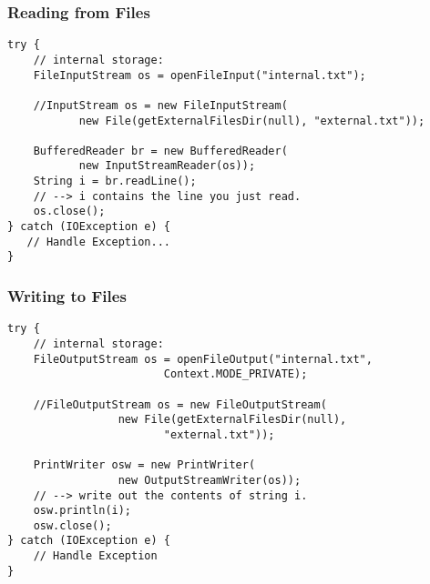 \begin{frame}[fragile]
\frametitle{Reading from Files}
\begin{changemargin}{1cm}

{\scriptsize
\begin{verbatim}
try {
    // internal storage: 
    FileInputStream os = openFileInput("internal.txt");
    
    //InputStream os = new FileInputStream(
           new File(getExternalFilesDir(null), "external.txt"));
           
    BufferedReader br = new BufferedReader(
           new InputStreamReader(os));
    String i = br.readLine();
    // --> i contains the line you just read.
    os.close();
} catch (IOException e) {
   // Handle Exception...
}
\end{verbatim}
}

\end{changemargin}
\end{frame}


\begin{frame}[fragile]
\frametitle{Writing to Files}
\begin{changemargin}{1cm}

{\scriptsize
\begin{verbatim}
try {
    // internal storage:
    FileOutputStream os = openFileOutput("internal.txt", 
                        Context.MODE_PRIVATE);
                        
    //FileOutputStream os = new FileOutputStream(
                 new File(getExternalFilesDir(null), 
                        "external.txt"));

    PrintWriter osw = new PrintWriter(
                 new OutputStreamWriter(os));
    // --> write out the contents of string i.
    osw.println(i);
    osw.close();
} catch (IOException e) {
    // Handle Exception
}
\end{verbatim}
}


\end{changemargin}
\end{frame}

